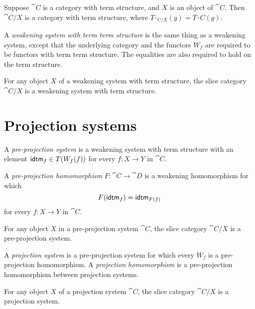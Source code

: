 \begin{defn}
Suppose $\cat{C}$ is a category with term structure, and $X$ is an object of $\cat{C}$. 
Then $\cat{C}/X$ is a category with term structure, where $T_{\cat{C}/X}(g)=T_\cat{C}(g)$.
\end{defn}

\begin{defn}
A \emph{weakening system with term term structure} is the same thing as a weakening system,
except that the underlying category and the functors $W_f$ are required to
be functors with term term structure. The equalities are also required to hold on the term structure.
\end{defn}

\begin{cor}
For any object $X$ of a weakening system with term structure, the slice category
$\cat{C}/X$ is a weakening system with term structure.
\end{cor}

\section{Projection systems}
\begin{defn}
A \emph{pre-projection system} is a weakening system with term structure with an element
$\tfid{f}\in T(W_f(f))$ for every $f:X\to Y$ in $\cat{C}$. 
\end{defn}

\begin{defn}
A \emph{pre-projection homomorphism} $F:\cat{C}\to\cat{D}$ is a weakening homomorphism for which
\begin{equation*}
F(\tfid{f})=\tfid{F(f)}
\end{equation*}
for every $f:X\to Y$ in $\cat{C}$.
\end{defn}

\begin{lem}
For any object $X$ in a pre-projection system $\cat{C}$, the slice category
$\cat{C}/X$ is a pre-projection system.
\end{lem}

\begin{defn}
A \emph{projection system} is a pre-projection system for which every $W_f$ is
a pre-projection homomorphism. A \emph{projection homomorphism} is a pre-projection homomorphism
between projection systems.
\end{defn}

\begin{cor}
For any object $X$ of a projection system $\cat{C}$, the slice category $\cat{C}/X$
is a projection system.
\end{cor}

